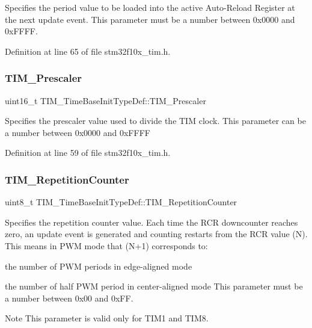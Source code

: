 Specifies the period value to be loaded into the active Auto-\/\+Reload Register at the next update event. This parameter must be a number between 0x0000 and 0x\+F\+F\+FF. 

Definition at line 65 of file stm32f10x\+\_\+tim.\+h.

\mbox{\label{struct_t_i_m___time_base_init_type_def_a6d3c8632780db819b2eb811e71ce251e}} 
\subsubsection{\texorpdfstring{T\+I\+M\+\_\+\+Prescaler}{TIM\_Prescaler}}
{\footnotesize\ttfamily uint16\+\_\+t T\+I\+M\+\_\+\+Time\+Base\+Init\+Type\+Def\+::\+T\+I\+M\+\_\+\+Prescaler}

Specifies the prescaler value used to divide the T\+IM clock. This parameter can be a number between 0x0000 and 0x\+F\+F\+FF 

Definition at line 59 of file stm32f10x\+\_\+tim.\+h.

\mbox{\label{struct_t_i_m___time_base_init_type_def_a81648259851390e090e1f507dfea7de8}} 
\subsubsection{\texorpdfstring{T\+I\+M\+\_\+\+Repetition\+Counter}{TIM\_RepetitionCounter}}
{\footnotesize\ttfamily uint8\+\_\+t T\+I\+M\+\_\+\+Time\+Base\+Init\+Type\+Def\+::\+T\+I\+M\+\_\+\+Repetition\+Counter}

Specifies the repetition counter value. Each time the R\+CR downcounter reaches zero, an update event is generated and counting restarts from the R\+CR value (N). This means in P\+WM mode that (N+1) corresponds to\+:
\begin{DoxyItemize}
\item the number of P\+WM periods in edge-\/aligned mode
\item the number of half P\+WM period in center-\/aligned mode This parameter must be a number between 0x00 and 0x\+FF. \begin{DoxyNote}{Note}
This parameter is valid only for T\+I\+M1 and T\+I\+M8. 
\end{DoxyNote}

\end{DoxyItemize}

